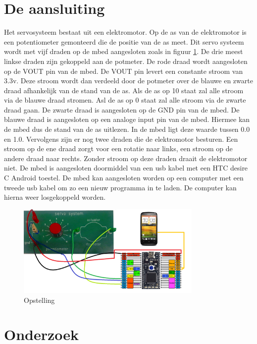 \documentclass[a4paper]{article}
\begin{document}
	\section{De aansluiting}
		Het servosysteem bestaat uit een elektromotor. Op de as van de elektromotor is een potentiometer gemonteerd die de positie van de as meet. Dit servo systeem wordt met vijf draden op de mbed aangesloten zoals in figuur \ref{fig:opstelling}.
De drie meest linkse draden zijn gekoppeld aan de potmeter. De rode draad wordt aangesloten op de VOUT pin van de mbed. De VOUT pin levert een constante stroom van 3.3v. Deze stroom wordt dan verdeeld door de potmeter over de blauwe en zwarte draad afhankelijk van de stand van de as. Als de as op 10 staat zal alle stroom via de blauwe draad stromen. Asl de as op 0 staat zal alle stroom via de zwarte draad gaan. De zwarte draad is aangesloten op de GND pin van de mbed. De blauwe draad is aangesloten op een analoge input pin van de mbed. Hiermee kan de mbed dus de stand van de as uitlezen. In de mbed ligt deze waarde tussen 0.0 en 1.0. Vervolgens zijn er nog twee draden die de elektromotor besturen. Een stroom op de ene draad zorgt voor een rotatie naar links, een stroom op de andere draad naar rechts. Zonder stroom op deze draden draait de elektromotor niet. De mbed is aangesloten doormiddel van een usb kabel met een HTC desire C Android toestel. De mbed kan aangesloten worden op een computer met een tweede usb kabel om zo een nieuw programma in te laden. De computer kan hierna weer losgekoppeld worden.
	\begin{figure}[h]
		\centering
		\includegraphics[width=0.8\textwidth]{imgs/opstelling.png}
		\caption{Opstelling}
		\label{fig:opstelling}
	\end{figure}
		\newpage
	\section{Onderzoek}
\end{document}
